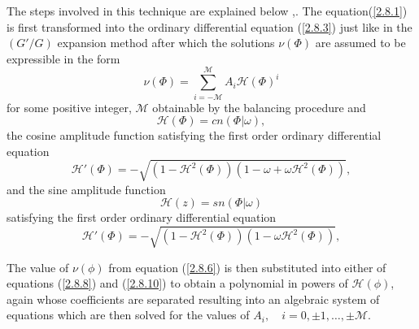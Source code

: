 \begin{defn}
The steps involved in this technique are explained below \citep{hong2013new},\citep{hong2009extended}.
The equation(\ref{2.8.1}) is first transformed into the ordinary differential equation (\ref{2.8.3}) just like in the $(G'/G)$ expansion method after which the  solutions $\nu(\varPhi) $ are assumed to be expressible in the form
\begin{equation}
 \nu(\varPhi) = \sum_{i=-\mathcal{M}}^{\mathcal{M}}A_i \mathcal{H}(\varPhi)^i  \label{2.8.6} 
\end{equation} for some positive integer, $\mathcal{M}$ obtainable by the balancing procedure and \begin{equation} \mathcal{H}(\varPhi) = cn(\varPhi|\omega), \label{2.8.7}
\end{equation} the cosine amplitude function satisfying the first order ordinary differential equation %
\begin{equation} \mathcal{H}'(\varPhi) = - \sqrt{ \left(  1- \mathcal{H}^2(\varPhi) \right) \left( 1- \omega + \omega \mathcal{H}^2(\varPhi) \right)  }, \label{2.8.8}
\end{equation} and the sine amplitude function \begin{equation}
	\mathcal{H}(z) = sn( \varPhi|\omega) \label{2.8.9}
\end{equation} satisfying the first order ordinary differential equation 
\begin{equation}
	\mathcal{H}'(\varPhi) = - \sqrt{ \left(  1- \mathcal{H}^2(\varPhi) \right) \left( 1-\omega \mathcal{H}^2(\varPhi) \right)  }, \label{2.8.10}
\end{equation}
\begin{rem} The value of $ \nu(\phi)$ from equation (\ref{2.8.6}) is then substituted into either of equations (\ref{2.8.8}) and (\ref{2.8.10}) to obtain a polynomial in powers of $ \mathcal{H}(\phi)$, again whose coefficients are separated resulting into an algebraic system of equations which are then solved for the values of $ A_i, \quad i = 0,\pm 1,\ldots,\pm \mathcal{M}$.
\end{rem}

\end{defn}
